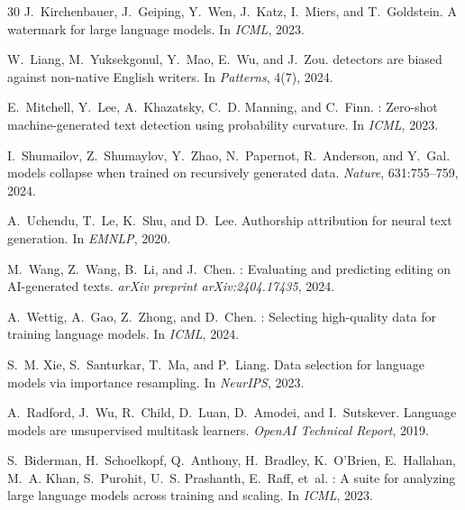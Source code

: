 \documentclass[11pt,a4paper]{article}
\begin{document}
\begin{thebibliography}{30}
J.~Kirchenbauer, J.~Geiping, Y.~Wen, J.~Katz, I.~Miers, and T.~Goldstein.
\newblock A watermark for large language models.
\newblock In \emph{ICML}, 2023.

W.~Liang, M.~Yuksekgonul, Y.~Mao, E.~Wu, and J.~Zou.
 detectors are biased against non-native {English} writers.
\newblock In \emph{Patterns}, 4(7), 2024.

E.~Mitchell, Y.~Lee, A.~Khazatsky, C.~D. Manning, and C.~Finn.
: Zero-shot machine-generated text detection using probability curvature.
\newblock In \emph{ICML}, 2023.

I.~Shumailov, Z.~Shumaylov, Y.~Zhao, N.~Papernot, R.~Anderson, and Y.~Gal.
 models collapse when trained on recursively generated data.
\newblock \emph{Nature}, 631:755--759, 2024.

A.~Uchendu, T.~Le, K.~Shu, and D.~Lee.
\newblock Authorship attribution for neural text generation.
\newblock In \emph{EMNLP}, 2020.

M.~Wang, Z.~Wang, B.~Li, and J.~Chen.
: Evaluating and predicting editing on {AI}-generated texts.
\newblock \emph{arXiv preprint arXiv:2404.17435}, 2024.

A.~Wettig, A.~Gao, Z.~Zhong, and D.~Chen.
: Selecting high-quality data for training language models.
\newblock In \emph{ICML}, 2024.

S.~M. Xie, S.~Santurkar, T.~Ma, and P.~Liang.
\newblock Data selection for language models via importance resampling.
\newblock In \emph{NeurIPS}, 2023.

A.~Radford, J.~Wu, R.~Child, D.~Luan, D.~Amodei, and I.~Sutskever.
\newblock Language models are unsupervised multitask learners.
\newblock \emph{OpenAI Technical Report}, 2019.

S.~Biderman, H.~Schoelkopf, Q.~Anthony, H.~Bradley, K.~O'Brien, E.~Hallahan, M.~A. Khan, S.~Purohit, U.~S. Prashanth, E.~Raff, et~al.
: A suite for analyzing large language models across training and scaling.
\newblock In \emph{ICML}, 2023.


\end{thebibliography}
\end{document}
